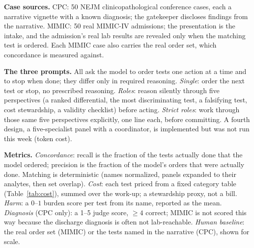 \documentclass[11pt]{article}
\begin{document}
\textbf{Case sources.} CPC: 50 NEJM clinicopathological conference cases, each a narrative vignette with a known diagnosis; the gatekeeper discloses findings from the narrative. MIMIC: 50 real MIMIC-IV admissions; the presentation is the intake, and the admission's real lab results are revealed only when the matching test is ordered. Each MIMIC case also carries the real order set, which concordance is measured against.

\textbf{The three prompts.} All ask the model to order tests one action at a time and to stop when done; they differ only in required reasoning. \emph{Single}: order the next test or stop, no prescribed reasoning. \emph{Roles}: reason silently through five perspectives (a ranked differential, the most discriminating test, a falsifying test, cost stewardship, a validity checklist) before acting. \emph{Strict roles}: work through those same five perspectives explicitly, one line each, before committing. A fourth design, a five-specialist panel with a coordinator, is implemented but was not run this week (token cost).

\textbf{Metrics.} \emph{Concordance}: recall is the fraction of the tests actually done that the model ordered; precision is the fraction of the model's orders that were actually done. Matching is deterministic (names normalized, panels expanded to their analytes, then set overlap). \emph{Cost}: each test priced from a fixed category table (Table~\ref{tab:cost}), summed over the work-up; a stewardship proxy, not a bill. \emph{Harm}: a $0$--$1$ burden score per test from its name, reported as the mean. \emph{Diagnosis} (CPC only): a 1--5 judge score, $\geq 4$ correct; MIMIC is not scored this way because the discharge diagnosis is often not lab-reachable. \emph{Human baseline}: the real order set (MIMIC) or the tests named in the narrative (CPC), shown for scale.
\end{document}

